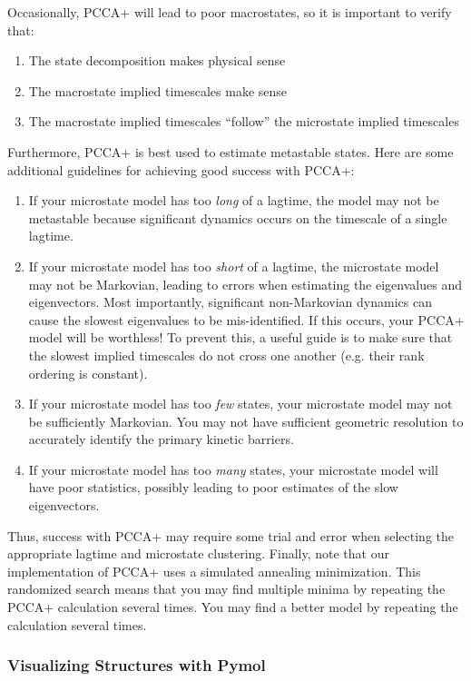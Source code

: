 \documentclass[12pt]{article}
\begin{document}
Occasionally, PCCA+ will lead to poor macrostates, so it is important to verify that:

\begin{enumerate}
 \item The state decomposition makes physical sense
 \item The macrostate implied timescales make sense
 \item The macrostate implied timescales ``follow'' the microstate implied timescales
\end{enumerate}

Furthermore, PCCA+ is best used to estimate metastable states.  Here are some additional guidelines for achieving good success with PCCA+:

\begin{enumerate}
 \item If your microstate model has too \emph{long} of a lagtime, the model may not be metastable because significant dynamics occurs on the timescale of a single lagtime. 
 \item If your microstate model has too \emph{short} of a lagtime, the microstate model may not be Markovian, leading to errors when estimating the eigenvalues and eigenvectors.  Most importantly, significant non-Markovian dynamics can cause the slowest eigenvalues to be mis-identified.  If this occurs, your PCCA+ model will be worthless!  To prevent this, a useful guide is to make sure that the slowest implied timescales do not cross one another (e.g. their rank ordering is constant).  
 \item If your microstate model has too \emph{few} states, your microstate model may not be sufficiently Markovian.  You may not have sufficient geometric resolution to accurately identify the primary kinetic barriers.
 \item If your microstate model has too \emph{many} states, your microstate model will have poor statistics, possibly leading to poor estimates of the slow eigenvectors. 
\end{enumerate}

Thus, success with PCCA+ may require some trial and error when selecting the appropriate lagtime and microstate clustering.  Finally, note that our implementation of PCCA+ uses a simulated annealing minimization.  This randomized search means that you may find multiple minima by repeating the PCCA+ calculation several times.  You may find a better model by repeating the calculation several times.  

\subsubsection{Visualizing Structures with Pymol}
\end{document}
